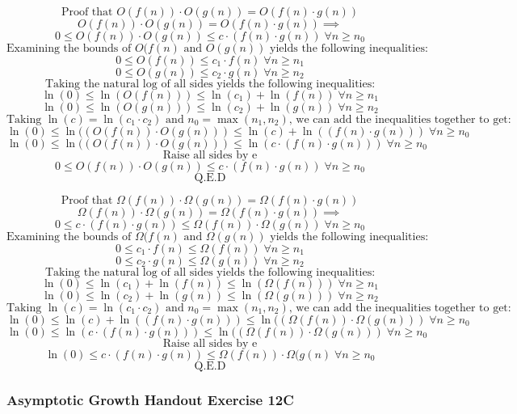 \documentclass{article}
\begin{document}
$$\text{Proof that } O(f(n)) \cdot O(g(n)) = O(f(n) \cdot g(n))$$
$$O(f(n)) \cdot O(g(n)) = O(f(n) \cdot g(n)) \implies$$
$$0 \le O(f(n)) \cdot O(g(n)) \le c \cdot (f(n) \cdot g(n)) \; \forall n \ge n_0$$
$$\text{Examining the bounds of } O(f(n) \text{ and } O(g(n)) \text{ yields the following inequalities:}$$
$$0 \le O(f(n)) \le c_1 \cdot f(n)  \; \forall n \ge n_1$$
$$0 \le O(g(n)) \le c_2 \cdot g(n)  \; \forall n \ge n_2$$
$$\text{Taking the natural log of all sides yields the following inequalities:}$$
$$\ln(0) \le \ln(O(f(n))) \le \ln(c_1) + \ln(f(n))  \; \forall n \ge n_1$$
$$\ln(0) \le \ln(O(g(n))) \le \ln(c_2) + \ln(g(n))  \; \forall n \ge n_2$$
$$\text{Taking } \ln(c) = \ln(c_1 \cdot c_2) \text{ and } n_0 = \max(n_1 , n_2) \text{, we can add the inequalities together to get:}$$
$$\ln(0) \le \ln((O(f(n)) \cdot O(g(n))) \le \ln(c) + \ln((f(n) \cdot g(n))) \; \forall n \ge n_0$$
$$\ln(0) \le \ln((O(f(n)) \cdot O(g(n))) \le \ln(c \cdot (f(n) \cdot g(n))) \; \forall n \ge n_0$$
$$\text{Raise all sides by e}$$
$$0 \le O(f(n)) \cdot O(g(n)) \le c \cdot (f(n) \cdot g(n)) \; \forall n \ge n_0$$
$$\text{Q.E.D}$$

$$\text{Proof that } \Omega(f(n)) \cdot \Omega(g(n)) = \Omega(f(n) \cdot g(n))$$
$$\Omega(f(n)) \cdot \Omega(g(n)) = \Omega(f(n) \cdot g(n)) \implies$$
$$0 \le c \cdot (f(n) \cdot g(n)) \le \Omega(f(n)) \cdot \Omega(g(n))  \; \forall n \ge n_0$$
$$\text{Examining the bounds of } \Omega(f(n) \text{ and } \Omega(g(n)) \text{ yields the following inequalities:}$$
$$0 \le c_1 \cdot f(n) \le \Omega(f(n)) \; \forall n \ge n_1$$
$$0 \le c_2 \cdot g(n) \le \Omega(g(n)) \; \forall n \ge n_2$$
$$\text{Taking the natural log of all sides yields the following inequalities:}$$
$$\ln(0) \le \ln(c_1) + \ln(f(n)) \le \ln(\Omega(f(n))) \; \forall n \ge n_1$$
$$\ln(0) \le \ln(c_2) + \ln(g(n)) \le \ln(\Omega(g(n))) \; \forall n \ge n_2$$
$$\text{Taking } \ln(c) = \ln(c_1 \cdot c_2) \text{ and } n_0 = \max(n_1 , n_2) \text{, we can add the inequalities together to get:}$$
$$\ln(0) \le \ln(c) + \ln((f(n) \cdot g(n))) \le \ln((\Omega(f(n)) \cdot \Omega(g(n))) \; \forall n \ge n_0$$
$$\ln(0) \le \ln(c \cdot (f(n) \cdot g(n))) \le \ln((\Omega(f(n)) \cdot \Omega(g(n))) \; \forall n \ge n_0$$
$$\text{Raise all sides by e}$$
$$\ln(0) \le c \cdot (f(n) \cdot g(n)) \le \Omega(f(n)) \cdot \Omega(g(n) \; \forall n \ge n_0$$
$$\text{Q.E.D}$$

\subsubsection{Asymptotic Growth Handout Exercise 12C}
\end{document}
